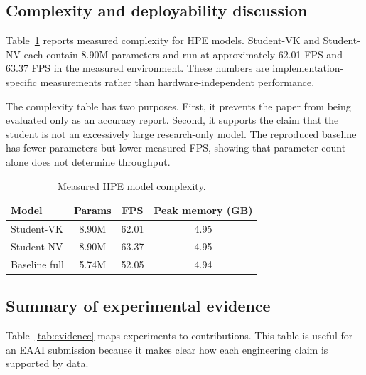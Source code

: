 \documentclass[preprint,12pt]{elsarticle}
\begin{document}
\subsection{Complexity and deployability discussion}

Table~\ref{tab:complexity} reports measured complexity for HPE models. Student-VK and Student-NV each contain 8.90M parameters and run at approximately 62.01 FPS and 63.37 FPS in the measured environment. These numbers are implementation-specific measurements rather than hardware-independent performance.

The complexity table has two purposes. First, it prevents the paper from being evaluated only as an accuracy report. Second, it supports the claim that the student is not an excessively large research-only model. The reproduced baseline has fewer parameters but lower measured FPS, showing that parameter count alone does not determine throughput.

\begin{table}[t]
\centering
\caption{Measured HPE model complexity.}
\label{tab:complexity}
\begin{tabular}{lccc}
\toprule
Model & Params & FPS & Peak memory (GB) \\
\midrule
Student-VK & 8.90M & 62.01 & 4.95 \\
Student-NV & 8.90M & 63.37 & 4.95 \\
Baseline full & 5.74M & 52.05 & 4.94 \\
\bottomrule
\end{tabular}
\end{table}

\subsection{Summary of experimental evidence}

Table~\ref{tab:evidence} maps experiments to contributions. This table is useful for an EAAI submission because it makes clear how each engineering claim is supported by data.
\end{document}
